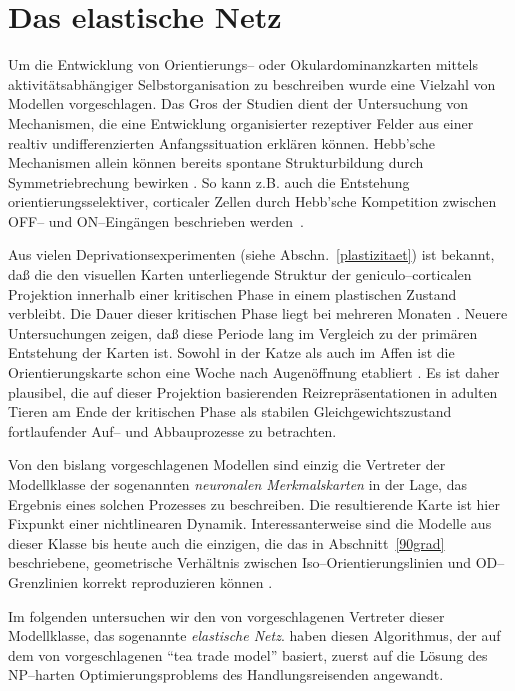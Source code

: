 \section{Das elastische Netz}
\label{modell}
\thispagestyle{plain}

Um die Entwicklung von Orientierungs-- oder Okulardominanzkarten mittels
aktivitätsabhängiger Selbstorganisation zu beschreiben wurde eine
Vielzahl von Modellen vorgeschlagen. Das Gros der Studien dient der
Untersuchung von Mechanismen, die eine Entwicklung organisierter rezeptiver
Felder aus einer realtiv undifferenzierten Anfangssituation erklären
können. Hebb'sche Mechanismen allein können bereits spontane
Strukturbildung durch Symmetriebrechung bewirken \cite{linsker:1986}. So
kann z.B. auch die Entstehung orientierungsselektiver, corticaler Zellen
durch Hebb'sche Kompetition zwischen OFF-- und ON--Eingängen beschrieben
werden~\cite{miller:1994}.

Aus vielen Deprivationsexperimenten (siehe Abschn.~\ref{plastizitaet}) ist
bekannt, daß die den visuellen Karten unterliegende Struktur der
geniculo--corticalen Projektion innerhalb einer kritischen Phase in einem
plastischen Zustand verbleibt. Die Dauer dieser kritischen Phase liegt bei
mehreren Monaten \cite{hubel:1970}. Neuere Untersuchungen zeigen, daß
diese Periode lang im Vergleich zu der primären Entstehung der Karten
ist. Sowohl in der Katze als auch im Affen ist die Orientierungskarte schon
eine Woche nach Augenöffnung etabliert
\cite{bonhoeffer:1995,blasdel:1995}. Es ist daher plausibel, die auf
dieser Projektion basierenden Reizrepräsentationen in adulten Tieren am
Ende der kritischen Phase als stabilen Gleichgewichtszustand fortlaufender
Auf-- und Abbauprozesse zu betrachten.

Von den bislang vorgeschlagenen Modellen sind einzig die Vertreter der
Modellklasse der sogenannten \emph{neuronalen Merkmalskarten} in der Lage,
das Ergebnis eines solchen Prozesses zu beschreiben. Die resultierende
Karte ist hier Fixpunkt einer nichtlinearen Dynamik. Interessanterweise
sind die Modelle aus dieser Klasse bis heute auch die einzigen, die das in
Abschnitt~\ref{90grad} beschriebene, geometrische Verhältnis zwischen
Iso--Orientierungslinien und OD--Grenzlinien korrekt reproduzieren können
\parencite[vgl. Abb.~\ref{odop_hist},links und ][]{erwin:1995}.

Im folgenden untersuchen wir den von \textcite{durbin:1991}
vorgeschlagenen Vertreter dieser Modellklasse, das sogenannte
\emph{elastische Netz}. \textcite{durbin:1987} haben diesen Algorithmus,
der auf dem von \textcite{marlsburg:1976} vorgeschlagenen ``tea
trade model'' basiert, zuerst auf die Lösung des
NP--harten Optimierungsproblems des Handlungsreisenden angewandt.

